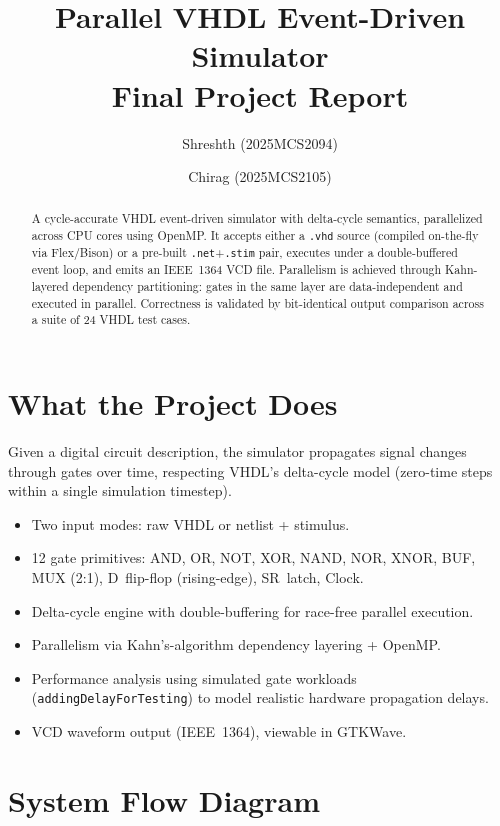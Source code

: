 \documentclass[9pt,a4paper]{article}
\title{\textbf{Parallel VHDL Event-Driven Simulator}\\[4pt]
\large Final Project Report}
\author{Shreshth (2025MCS2094) \and Chirag  (2025MCS2105)}
\begin{document}
\maketitle

\begin{abstract}
A cycle-accurate VHDL event-driven simulator with delta-cycle semantics, parallelized across CPU cores using OpenMP. It accepts either a \texttt{.vhd} source (compiled on-the-fly via Flex/Bison) or a pre-built \texttt{.net}+\texttt{.stim} pair, executes under a double-buffered event loop, and emits an IEEE~1364 VCD file. Parallelism is achieved through Kahn-layered dependency partitioning: gates in the same layer are data-independent and executed in parallel. Correctness is validated by bit-identical output comparison across a suite of 24 VHDL test cases.
\end{abstract}

\vspace{0.6em}

\section{What the Project Does}

Given a digital circuit description, the simulator propagates signal changes through gates over time, respecting VHDL's delta-cycle model (zero-time steps within a single simulation timestep).

\begin{itemize}[leftmargin=1.5em,itemsep=2pt]
  \item Two input modes: raw VHDL or netlist + stimulus.
  \item 12 gate primitives: AND, OR, NOT, XOR, NAND, NOR, XNOR, BUF, MUX (2:1), D~flip-flop (rising-edge), SR~latch, Clock.
  \item Delta-cycle engine with double-buffering for race-free parallel execution.
  \item Parallelism via Kahn's-algorithm dependency layering + OpenMP.
  \item Performance analysis using simulated gate workloads (\texttt{addingDelayForTesting}) to model realistic hardware propagation delays.
  \item VCD waveform output (IEEE~1364), viewable in GTKWave.
\end{itemize}

\section{System Flow Diagram}
\end{document}
